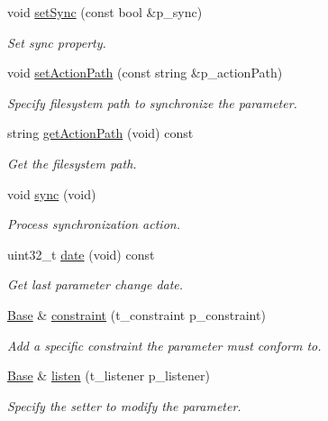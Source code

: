 \begin{DoxyCompactItemize}
void \hyperlink{classxtd_1_1servers_1_1param_1_1Base_a912fb989f6ecb224596add4d0b388102}{set\-Sync} (const bool \&p\-\_\-sync)
\begin{DoxyCompactList}\small\item\em Set sync property. \end{DoxyCompactList}\item 
void \hyperlink{classxtd_1_1servers_1_1param_1_1Base_a824470386f5a0f25824b6be50d15a38a}{set\-Action\-Path} (const string \&p\-\_\-action\-Path)
\begin{DoxyCompactList}\small\item\em Specify filesystem path to synchronize the parameter. \end{DoxyCompactList}\item 
string \hyperlink{classxtd_1_1servers_1_1param_1_1Base_a69c3c92644e04f22b9dba10095b0ed3b}{get\-Action\-Path} (void) const 
\begin{DoxyCompactList}\small\item\em Get the filesystem path. \end{DoxyCompactList}\item 
void \hyperlink{classxtd_1_1servers_1_1param_1_1Base_a74c2c5e1bac271ebbb80b93c1b976b47}{sync} (void)
\begin{DoxyCompactList}\small\item\em Process synchronization action. \end{DoxyCompactList}\item 
uint32\-\_\-t \hyperlink{classxtd_1_1servers_1_1param_1_1Base_a532c7d291a15c2d611af8ab9898239f2}{date} (void) const 
\begin{DoxyCompactList}\small\item\em Get last parameter change date. \end{DoxyCompactList}\item 
\hyperlink{classxtd_1_1servers_1_1param_1_1Base}{Base} \& \hyperlink{classxtd_1_1servers_1_1param_1_1Base_aeafea08d04f6c7af78014a4991f38b57}{constraint} (t\-\_\-constraint p\-\_\-constraint)
\begin{DoxyCompactList}\small\item\em Add a specific constraint the parameter must conform to. \end{DoxyCompactList}\item 
\hyperlink{classxtd_1_1servers_1_1param_1_1Base}{Base} \& \hyperlink{classxtd_1_1servers_1_1param_1_1Base_a819665d57d109485c4ba16352efc75e3}{listen} (t\-\_\-listener p\-\_\-listener)
\begin{DoxyCompactList}\small\item\em Specify the setter to modify the parameter. \end{DoxyCompactList}\item 

\end{DoxyCompactItemize}
